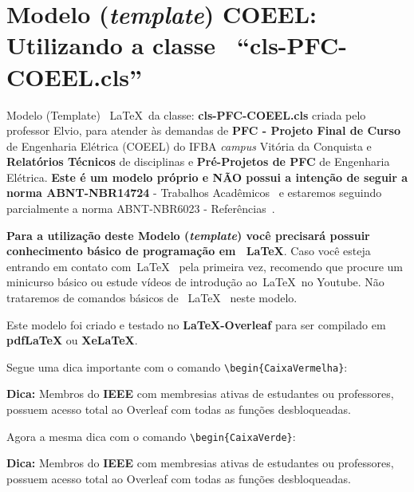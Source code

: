 
\chapter*{\vspace{-14mm} Modelo ({\it template}) COEEL:  Utilizando a classe ~``cls-PFC-COEEL.cls''}

\vspace{-5mm}
Modelo (Template) ~\LaTeX ~da classe: {\bf cls-PFC-COEEL.cls} criada pelo professor Elvio, para atender às demandas de \textbf{PFC - Projeto Final de Curso} de Engenharia Elétrica (\gls{COEEL}) do IFBA {\it campus} Vitória da Conquista e \textbf{Relatórios Técnicos} de disciplinas e {\bf Pré-Projetos de PFC} de Engenharia Elétrica. {\bf Este é um modelo próprio e NÃO possui a intenção de seguir a norma ABNT-NBR14724} - Trabalhos Acadêmicos~\cite{NBR14724_TrabalhosAcademicos} e estaremos seguindo parcialmente a norma {ABNT-NBR6023} - Referências~\cite{NBR6023_Referencias}.

{\bf Para a utilização deste Modelo ({\it template}) você precisará possuir conhecimento básico de programação em ~\LaTeX}. Caso você esteja entrando em contato com~\LaTeX~ pela primeira vez, recomendo que procure um minicurso básico ou estude vídeos de introdução ao~\LaTeX~no Youtube. Não trataremos de comandos básicos de ~\LaTeX~ neste modelo.

Este modelo foi criado e testado no  {\bf \LaTeX-Overleaf} para ser compilado em {\bf pdfLaTeX} ou {\bf XeLaTeX}.

Segue uma dica importante com o comando \verb|\begin{CaixaVermelha}|:

\begin{CaixaVermelha}
    {\bf Dica:} Membros do {\bf \gls{IEEE}} com membresias ativas de estudantes ou professores, possuem acesso total ao Overleaf com todas as funções desbloqueadas.
\end{CaixaVermelha}

Agora a mesma dica com o comando \verb|\begin{CaixaVerde}|:

\begin{CaixaVerde}
    {\bf Dica:} Membros do {\bf \gls{IEEE}} com membresias ativas de estudantes ou professores, possuem acesso total ao Overleaf com todas as funções desbloqueadas.
\end{CaixaVerde}

